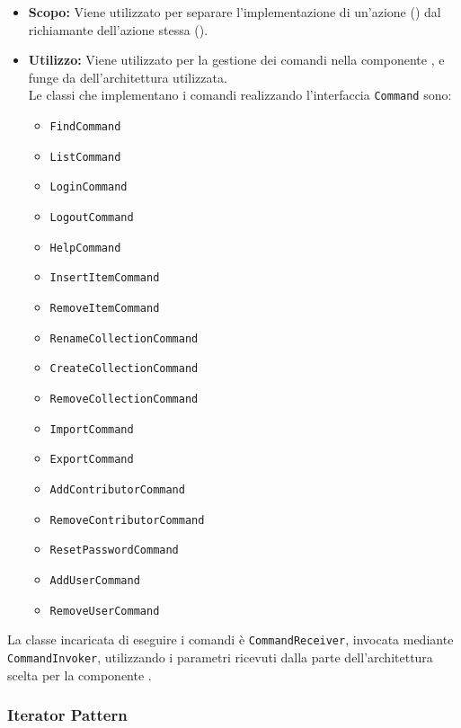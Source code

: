 \documentclass{scalatekids-article}
\begin{document}
\begin{itemize}
\item \textbf{Scopo:} Viene utilizzato per separare l'implementazione di un'azione
  () dal richiamante dell'azione stessa ().
\item \textbf{Utilizzo:} Viene utilizzato per la gestione dei comandi nella componente
  , e funge da  dell'architettura  utilizzata.\\
  Le classi che implementano i comandi realizzando l'interfaccia \verb=Command= sono:
  \begin{itemize}
  \item \verb=FindCommand=
  \item \verb=ListCommand=
  \item \verb=LoginCommand=
  \item \verb=LogoutCommand=
  \item \verb=HelpCommand=
  \item \verb=InsertItemCommand=
  \item \verb=RemoveItemCommand=
  \item \verb=RenameCollectionCommand=
  \item \verb=CreateCollectionCommand=
  \item \verb=RemoveCollectionCommand=
  \item \verb=ImportCommand=
  \item \verb=ExportCommand=
  \item \verb=AddContributorCommand=
  \item \verb=RemoveContributorCommand=
  \item \verb=ResetPasswordCommand=
  \item \verb=AddUserCommand=
  \item \verb=RemoveUserCommand=
  \end{itemize}
\end{itemize}

La classe incaricata di eseguire i comandi è \verb=CommandReceiver=, invocata mediante
\verb=CommandInvoker=, utilizzando i parametri ricevuti dalla parte 
dell'architettura  scelta per la componente .

\subsubsection{Iterator Pattern}
\end{document}
